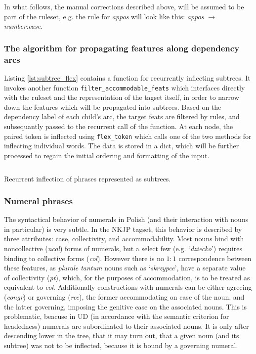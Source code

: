 \documentclass[12pt]{article}
\newcommand{\inlinegloss}[1]{`\textit{#1}'}
\begin{document}
\noindent In what follows, the manual corrections described above, will be assumed to be part of the ruleset, e.g. the rule for \textit{appos} will look like this: \textit{appos} $\rightarrow$ \textit{number:case}.

\subsubsection{The algorithm for propagating features along dependency arcs}

Listing \ref{lst:subtree_flex} contains a function for recurrently inflecting subtrees. It invokes another function \texttt{filter_accommodable_feats} which interfaces directly with the ruleset and the representation of the tagset itself, in order to narrow down the features which will be propagated into subtrees. Based on the dependency label of each child's arc, the target feats are filtered by rules, and subsequantly passed to the recurrent call of the function. At each node, the paired token is inflected using \texttt{flex_token} which calls one of the two methods for inflecting individual words. The data is stored in a dict, which will be further processed to regain the initial ordering and formatting of the input.

\begin{listing}[htbp]
\inputminted[linenos,tabsize=2,breaklines]{Python}{subtree_flex_snippet.py}
\caption{Recurrent inflection of phrases represented as subtrees.}
\label{lst:subtree_flex}
\end{listing}

\subsubsection{Numeral phrases}
The syntactical behavior of numerals in Polish (and their interaction with nouns in particular) is very subtle. In the NKJP tagset, this behavior is described by three attributes: case, collectivity, and accommodability. Most nouns bind with noncollective (\textit{ncol}) forms of numerals, but a select few (e.g. \inlinegloss{dziecko}) requires binding to collective forms (\textit{col}). However there is no $1:1$ correspondence between these features, as \textit{plurale tantum} nouns such as \inlinegloss{skrzypce}, have a separate value of collectivity (\textit{pt}), which, for the purposes of accommodation, is to be treated as equivalent to \textit{col}. Additionally constructions with numerals can be either agreeing (\textit{congr}) or governing (\textit{rec}), the former accommodating on case of the noun, and the latter governing, imposing the genitive case on the associated nouns. This is problematic, beacuse in UD (in accordance with the semantic criterion for headedness) numerals are subordinated to their associated nouns. It is only after descending lower in the tree, that it may turn out, that a given noun (and its subtree) was not to be inflected, because it is bound by a governing numeral.
\end{document}
